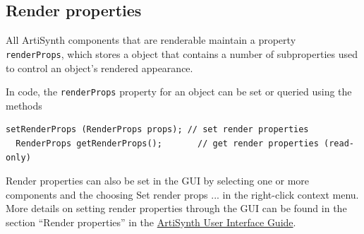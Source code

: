 






\subsection{Render properties}
\label{RenderProperties:sec}

All ArtiSynth components that are renderable maintain a property {\tt
renderProps}, which stores a
 object that contains a number
of subproperties used to control an object's rendered appearance.

In code, the {\tt renderProps} property for an object can be set or
queried using the methods
%
\begin{lstlisting}[]
  setRenderProps (RenderProps props); // set render properties
  RenderProps getRenderProps();       // get render properties (read-only)
\end{lstlisting}
%
Render properties can also be set in the GUI by selecting one or more
components and the choosing {\sf Set render props ...}  in the
right-click context menu. More details on setting render properties
through the GUI can be found in the section ``Render properties'' in the
\href{../uiguide/uiguide.html}{
ArtiSynth User Interface Guide}.

